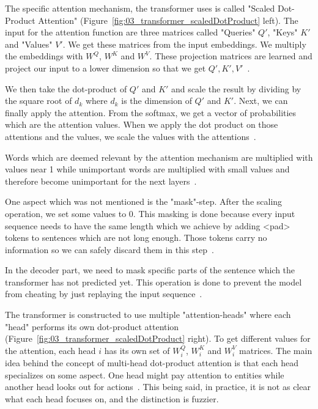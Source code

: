 The specific attention mechanism, the transformer uses is called "Scaled Dot-Product Attention" {(Figure~\ref{fig:03_transformer_scaledDotProduct} left)}. The input for the attention function are three matrices called "Queries" $Q'$, "Keys" $K'$ and "Values" $V'$. We get these matrices from the input embeddings. We multiply the embeddings with $W^Q$, $W^K$ and $W^V$. These projection matrices are learned and project our input to a lower dimension so that we get $Q', K', V'$~\cite{Vaswani2017d}.
\bigskip

We then take the dot-product of $Q'$ and $K'$ and scale the result by dividing by the square root of $d_k$ where $d_k$ is the dimension of $Q'$ and $K'$. Next, we can finally apply the attention. From the softmax, we get a vector of probabilities which are the attention values. When we apply the dot product on those attentions and the values, we scale the values with the attentions~\cite{Vaswani2017d}. 
\medskip

Words which are deemed relevant by the attention mechanism are multiplied with values near 1 while unimportant words are multiplied with small values and therefore become unimportant for the next layers~\cite{Vaswani2017d}.
\medskip

One aspect which was not mentioned is the "mask"-step. After the scaling operation, we set some values to 0. This masking is done because every input sequence needs to have the same length which we achieve by adding <pad> tokens to sentences which are not long enough. Those tokens carry no information so we can safely discard them in this step~\cite{Vaswani2017d}. 

In the decoder part, we need to mask specific parts of the sentence which the transformer has not predicted yet. This operation is done to prevent the model from cheating by just replaying the input sequence~\cite{Vaswani2017d}.
\medskip

The transformer is constructed to use multiple "attention-heads" where each "head" performs its own dot-product attention {(Figure~\ref{fig:03_transformer_scaledDotProduct} right)}. To get different values for the attention, each head $i$ has its own set of $W_i^Q$, $W_i^K$ and $W_i^V$ matrices. The main idea behind the concept of multi-head dot-product attention is that each head specializes on some aspect. One head might pay attention to entities while another head looks out for actions~\cite{Vaswani2017d}. This being said, in practice, it is not as clear what each head focuses on, and the distinction is fuzzier.

